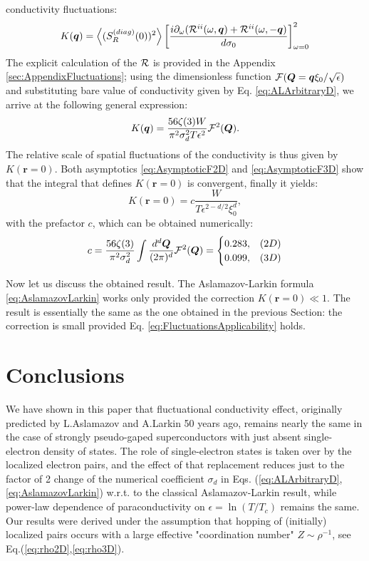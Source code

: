 \documentclass[twocolumn,english,prb]{revtex4-1}
\begin{document}
 conductivity fluctuations:
\begin{equation}
K(\boldsymbol{q})=\left\langle (S_{R}^{(diag)}(0))^{2}\right\rangle \left[\frac{i\partial_{\omega}({\cal R}^{ii}(\omega,\boldsymbol{q})+{\cal R}^{ii}(\omega,-\boldsymbol{q})}{d\sigma_{0}}\right]_{\omega=0}^{2}
\end{equation}
The explicit calculation of the ${\cal R}$ is provided in the Appendix \ref{sec:AppendixFluctuations}; using the dimensionless function ${\cal F}(\boldsymbol{Q} = \boldsymbol{q} \xi_0 / \sqrt{\epsilon})$ and substituting bare value of conductivity given by Eq. \eqref{eq:ALArbitraryD}, we arrive at the following general expression:
\begin{equation}
K(\boldsymbol{q})=\frac{56\zeta(3)W}{\pi^{2}\sigma_{d}^{2}T\epsilon^{2}}{\cal F}^{2}(\boldsymbol{Q}).
\end{equation}
The relative scale of spatial fluctuations of the conductivity is thus given by $K(\textbf{r} = 0)$.
 Both asymptotics \eqref{eq:AsymptoticF2D} and \eqref{eq:AsymptoticF3D} show that the integral that defines
$K(\textbf{r} = 0)$ is convergent, finally it yields:
\begin{equation}
K(\boldsymbol{r}=0)=c \frac{W}{T\epsilon^{2-d/2}\xi_{0}^{d}},
\label{Kend}
\end{equation}
with the  prefactor $c$, which can be obtained  numerically:
\begin{equation}
c=\frac{56\zeta(3)}{\pi^{2}\sigma_{d}^{2}}\int\frac{d^{d}\boldsymbol{Q}}{(2\pi)^{d}}{\cal F}^{2}(\boldsymbol{Q})=\begin{cases}
0.283, & (2D)\\
0.099, & (3D)
\end{cases}
\end{equation}

Now let us discuss the obtained result. The Aslamazov-Larkin formula \eqref{eq:AslamazovLarkin} works only provided the correction $K(\textbf{r} = 0) \ll 1$. The result is essentially the same as the one obtained in the previous Section: 
the correction is small provided Eq. \eqref{eq:FluctuationsApplicability} holds.

\section{Conclusions}
\label{sec:Conclusions}

We have shown in this paper that  fluctuational conductivity effect, originally predicted by L.Aslamazov and A.Larkin 50 years 
ago, remains nearly the same in the case of strongly pseudo-gaped superconductors with just absent single-electron density 
of states. The role of single-electron states is taken over by  the localized electron pairs, and the effect of that replacement
reduces just to the factor of 2 change of the numerical coefficient $\sigma_d$  in Eqs.
(\ref{eq:ALArbitraryD},\ref{eq:AslamazovLarkin})  w.r.t. to the classical  Aslamazov-Larkin result, 
while power-law dependence of paraconductivity on $\epsilon=\ln(T/T_c)$ remains the same.
Our results were derived under the assumption that hopping of (initially) localized pairs occurs with a
large effective "coordination number"  $Z  \sim \rho^{-1}$, see Eq.(\ref{eq:rho2D},\ref{eq:rho3D}).
\end{document}

